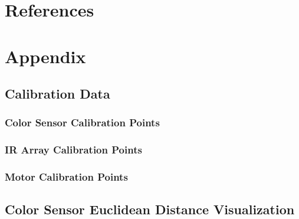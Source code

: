 \documentclass[11pt]{article}
\begin{document}
\section{References}

\newpage
\section{Appendix}

\subsection{Calibration Data}

\subsubsection{Color Sensor Calibration Points}


\subsubsection{IR Array Calibration Points}


\subsubsection{Motor Calibration Points}


\subsection{Color Sensor Euclidean Distance Visualization}


%
\end{document}
